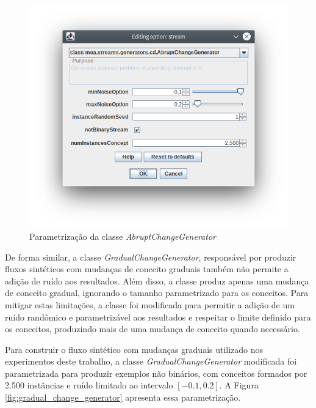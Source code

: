 \documentclass[qual, classic, a4paper]{ufbathesis}
\begin{document}
\begin{figure}[H]
    \begin{center}
        \includegraphics[width=\textwidth]{imagens/abrupt_change_generator.png}
        \caption{Parametrização da classe \textit{AbruptChangeGenerator}}
        \label{fig:abrupt_change_generator}
    \end{center}
\end{figure}

De forma similar, a classe \textit{GradualChangeGenerator}, responsável por produzir fluxos sintéticos com mudanças de conceito graduais também não permite a adição de ruído aos resultados.
Além disso, a classe produz apenas uma mudança de conceito gradual, ignorando o tamanho parametrizado para os conceitos.
Para mitigar estas limitações, a classe foi modificada para permitir a adição de um ruído randômico 
e parametrizável aos resultados e respeitar o limite definido para os conceitos, produzindo mais de uma mudança de conceito quando necessário.

Para construir o fluxo sintético com mudanças graduais utilizado nos experimentos deste trabalho, 
a classe \textit{GradualChangeGenerator} modificada foi parametrizada para produzir exemplos não binários, 
com conceitos formados por 2.500 instâncias e ruído limitado ao intervalo $[-0.1, 0.2]$.
A Figura \ref{fig:gradual_change_generator} apresenta essa parametrização.
\end{document}
